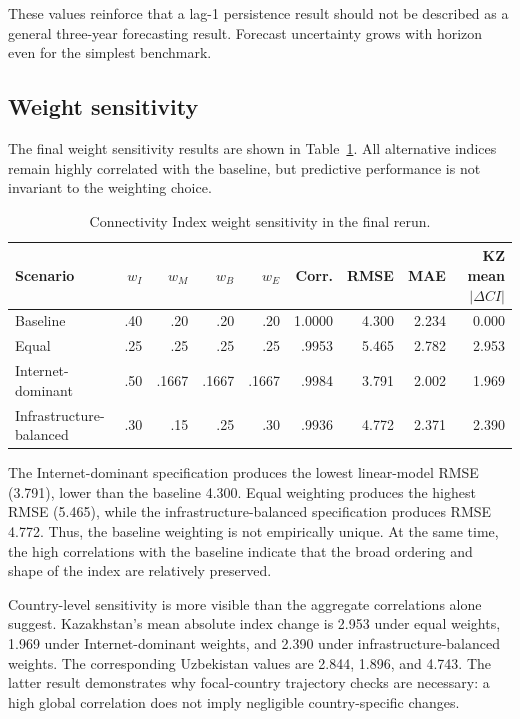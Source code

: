 \documentclass[conference]{IEEEtran}
\begin{document}
These values reinforce that a lag-1 persistence result should not be described as a general three-year forecasting result. Forecast uncertainty grows with horizon even for the simplest benchmark.

\subsection{Weight sensitivity}

The final weight sensitivity results are shown in Table~\ref{tab:weights}. All alternative indices remain highly correlated with the baseline, but predictive performance is not invariant to the weighting choice.

\begin{table}[t]
\centering
\caption{Connectivity Index weight sensitivity in the final rerun.}
\label{tab:weights}
\begin{tabular}{lrrrrrrrr}
\toprule
Scenario & $w_I$ & $w_M$ & $w_B$ & $w_E$ & Corr. & RMSE & MAE & KZ mean $|\Delta CI|$\\
\midrule
Baseline & .40 & .20 & .20 & .20 & 1.0000 & 4.300 & 2.234 & 0.000\\
Equal & .25 & .25 & .25 & .25 & .9953 & 5.465 & 2.782 & 2.953\\
Internet-dominant & .50 & .1667 & .1667 & .1667 & .9984 & 3.791 & 2.002 & 1.969\\
Infrastructure-balanced & .30 & .15 & .25 & .30 & .9936 & 4.772 & 2.371 & 2.390\\
\bottomrule
\end{tabular}
\end{table}

The Internet-dominant specification produces the lowest linear-model RMSE (3.791), lower than the baseline 4.300. Equal weighting produces the highest RMSE (5.465), while the infrastructure-balanced specification produces RMSE 4.772. Thus, the baseline weighting is not empirically unique. At the same time, the high correlations with the baseline indicate that the broad ordering and shape of the index are relatively preserved.

Country-level sensitivity is more visible than the aggregate correlations alone suggest. Kazakhstan's mean absolute index change is 2.953 under equal weights, 1.969 under Internet-dominant weights, and 2.390 under infrastructure-balanced weights. The corresponding Uzbekistan values are 2.844, 1.896, and 4.743. The latter result demonstrates why focal-country trajectory checks are necessary: a high global correlation does not imply negligible country-specific changes.
\end{document}
